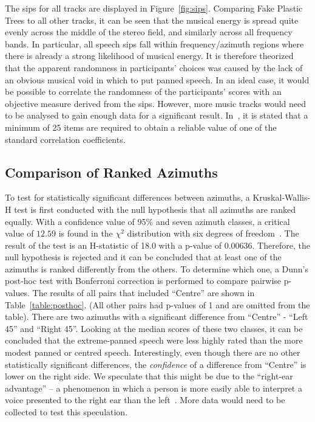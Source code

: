 \documentclass[a4paper,10pt]{edpsci} %
\begin{document}
The \glspl{sip} for all tracks are displayed in Figure~\ref{fig:sips}. Comparing Fake Plastic Trees to all other tracks, it can be seen that the musical energy is spread quite evenly across the middle of the stereo field, and similarly across all frequency bands. In particular, all speech \glspl{sip} fall within frequency/azimuth regions where there is already a strong likelihood of musical energy. It is therefore theorized that the apparent randomness in participants' choices was caused by the lack of an obvious musical void in which to put panned speech. In an ideal case, it would be possible to correlate the randomness of the participants' scores with an objective measure derived from the \glspl{sip}. However, more music tracks would need to be analysed to gain enough data for a significant result. In~\cite{bonett_sample_2000}, it is stated that a minimum of 25 items are required to obtain a reliable value of one of the standard correlation coefficients.

\subsection{Comparison of Ranked Azimuths}
\label{sec:comparison_of_ranked_azimuths}
To test for statistically significant differences between azimuths, a Kruskal-Wallis-H test is first conducted with the null hypothesis that all azimuths are ranked equally. With a confidence value of 95\% and seven azimuth classes, a critical value of $12.59$ is found in the $\chi^2$ distribution with six degrees of freedom~\cite{howell2013statistical}. The result of the test is an H-statistic of 18.0 with a p-value of 0.00636. Therefore, the null hypothesis is rejected and it can be concluded that at least one of the azimuths is ranked differently from the others. To determine which one, a Dunn's post-hoc test with Bonferroni correction is performed to compare pairwise p-values. The results of all pairs that included \enquote{Centre} are shown in Table~\ref{table:posthoc}. (All other pairs had p-values of 1 and are omitted from the table). There are two azimuths with a significant difference from \enquote{Centre} - \enquote{Left 45} and \enquote{Right 45}. Looking at the median scores of these two classes, it can be concluded that the extreme-panned speech were less highly rated than the more modest panned or centred speech. Interestingly, even though there are no other statistically significant differences, the \textit{confidence} of a difference from \enquote{Centre} is lower on the right side. We speculate that this might be due to the \enquote{right-ear advantage} -- a phenomenon in which a person is more easily able to interpret a voice presented to the right ear than the left~\cite{tanaka_neurophysiological_2021}. More data would need to be collected to test this speculation.
\end{document}

